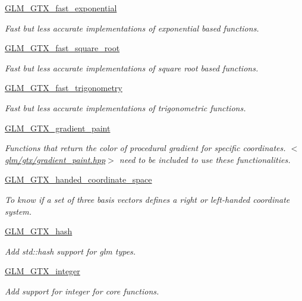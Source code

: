 \begin{DoxyCompactItemize}
\item 
\hyperlink{group__gtx__fast__exponential}{G\-L\-M\-\_\-\-G\-T\-X\-\_\-fast\-\_\-exponential}
\begin{DoxyCompactList}\small\item\em Fast but less accurate implementations of exponential based functions. \end{DoxyCompactList}\item 
\hyperlink{group__gtx__fast__square__root}{G\-L\-M\-\_\-\-G\-T\-X\-\_\-fast\-\_\-square\-\_\-root}
\begin{DoxyCompactList}\small\item\em Fast but less accurate implementations of square root based functions. \end{DoxyCompactList}\item 
\hyperlink{group__gtx__fast__trigonometry}{G\-L\-M\-\_\-\-G\-T\-X\-\_\-fast\-\_\-trigonometry}
\begin{DoxyCompactList}\small\item\em Fast but less accurate implementations of trigonometric functions. \end{DoxyCompactList}\item 
\hyperlink{group__gtx__gradient__paint}{G\-L\-M\-\_\-\-G\-T\-X\-\_\-gradient\-\_\-paint}
\begin{DoxyCompactList}\small\item\em Functions that return the color of procedural gradient for specific coordinates. $<$\hyperlink{gradient__paint_8hpp}{glm/gtx/gradient\-\_\-paint.\-hpp}$>$ need to be included to use these functionalities. \end{DoxyCompactList}\item 
\hyperlink{group__gtx__handed__coordinate__space}{G\-L\-M\-\_\-\-G\-T\-X\-\_\-handed\-\_\-coordinate\-\_\-space}
\begin{DoxyCompactList}\small\item\em To know if a set of three basis vectors defines a right or left-\/handed coordinate system. \end{DoxyCompactList}\item 
\hyperlink{group__gtx__hash}{G\-L\-M\-\_\-\-G\-T\-X\-\_\-hash}
\begin{DoxyCompactList}\small\item\em Add std\-::hash support for glm types. \end{DoxyCompactList}\item 
\hyperlink{group__gtx__integer}{G\-L\-M\-\_\-\-G\-T\-X\-\_\-integer}
\begin{DoxyCompactList}\small\item\em Add support for integer for core functions. \end{DoxyCompactList}\item 

\end{DoxyCompactItemize}

